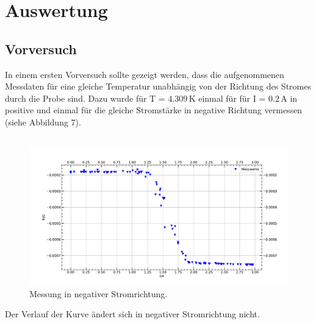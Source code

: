\documentclass[german,  %
parskip=full,  %
]{scrartcl}
\begin{document}
\newpage
\section{Auswertung}
\subsection{Vorversuch}
In einem ersten Vorversuch sollte gezeigt werden, dass die aufgenommenen Messdaten für eine gleiche Temperatur unabhängig von der Richtung des Stromes durch die Probe sind. Dazu wurde für T = $4.309$\,K einmal für für I = $0.2$\,A in positive und einmal für die gleiche Stromstärke in negative Richtung vermessen (siehe Abbildung 7). \\\\
\begin{figure}[h!]\centering
\includegraphics[width=\textwidth]{Vorversuch.pdf}
\caption{Messung in negativer Stromrichtung.}
\end{figure}


Der Verlauf der Kurve ändert sich in negativer Stromrichtung nicht.
\end{document}
